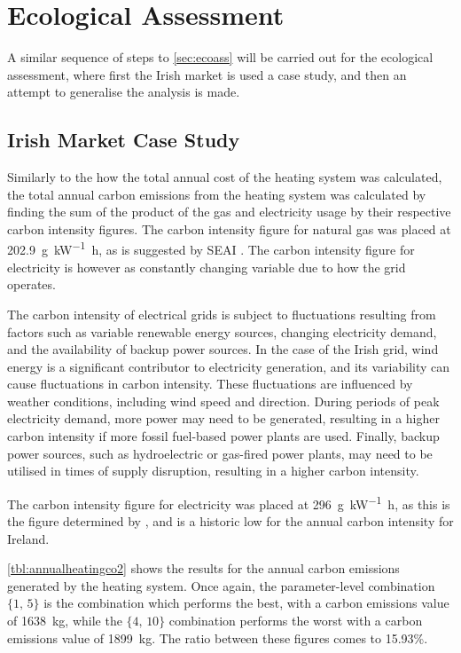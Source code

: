 \section{Ecological Assessment}

A similar sequence of steps to \cref{sec:ecoass} will be carried out for the ecological assessment, where first the Irish market is used a case study, and then an attempt to generalise the analysis is made. 


\subsection{Irish Market Case Study} \label{subsec:irishmarket}
Similarly to the how the total annual cost of the heating system was calculated, the total annual carbon emissions from the heating system was calculated by finding the sum of the product of the gas and electricity usage by their respective carbon intensity figures. The carbon intensity figure for natural gas was placed at \qty{202.9}{\gram\per\kilo\watt\hour}, as is suggested by SEAI \cite{seai_conversion_nodate}. The carbon intensity figure for electricity is however as constantly changing variable due to how the grid operates. 

The carbon intensity of electrical grids is subject to fluctuations resulting from factors such as variable renewable energy sources, changing electricity demand, and the availability of backup power sources. In the case of the Irish grid, wind energy is a significant contributor to electricity generation, and its variability can cause fluctuations in carbon intensity. These fluctuations are influenced by weather conditions, including wind speed and direction. During periods of peak electricity demand, more power may need to be generated, resulting in a higher carbon intensity if more fossil fuel-based power plants are used. Finally, backup power sources, such as hydroelectric or gas-fired power plants, may need to be utilised in times of supply disruption, resulting in a higher carbon intensity.

The carbon intensity figure for electricity was placed at \qty{296}{\gram\per\kilo\watt\hour}, as this is the figure determined by \citeauthor{seai_energy_2021}\cite{seai_energy_2021}, and is a historic low for the annual carbon intensity for Ireland. 

\cref{tbl:annualheatingco2} shows the results for the annual carbon emissions generated by the heating system. Once again, the parameter-level combination $\{1\text{, }5\}$ is the combination which performs the best, with a carbon emissions value of \qty{1638}{\kilo\gram}, while the $\{4\text{, }10\}$ combination performs the worst with a carbon emissions value of \qty{1899}{\kilo\gram}. The ratio between these figures comes to 15.93\%. 

